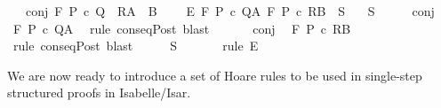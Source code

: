 \begin{isabellebody}
\ \ \ conj{\isacharcolon}\ {\isachardoublequoteopen}{\isasymGamma}{\isacharcomma}{\isasymTheta}{\isasymturnstile}\isactrlbsub {\isacharslash}F\isactrlesub \ P\ c\ {\isacharparenleft}Q\ {\isasyminter}\ R{\isacharparenright}{\isacharcomma}{\isacharparenleft}A\ {\isasyminter}\ B{\isacharparenright}{\isachardoublequoteclose}\ \isanewline
\ \ \ E{\isacharcolon}\ {\isachardoublequoteopen}{\isasymlbrakk}{\isasymGamma}{\isacharcomma}{\isasymTheta}{\isasymturnstile}\isactrlbsub {\isacharslash}F\isactrlesub \ P\ c\ Q{\isacharcomma}A{\isacharsemicolon}\ {\isasymGamma}{\isacharcomma}{\isasymTheta}{\isasymturnstile}\isactrlbsub {\isacharslash}F\isactrlesub \ P\ c\ R{\isacharcomma}B{\isasymrbrakk}\ {\isasymLongrightarrow}\ S{\isachardoublequoteclose}\isanewline
\ \ \ {\isachardoublequoteopen}S{\isachardoublequoteclose}\isanewline
%
\isadelimproof
%
\endisadelimproof
%
\isatagproof
{}\isamarkupfalse%
\ {\isacharminus}\isanewline
\ \ \isamarkupfalse%
\ conj\ \isamarkupfalse%
\ {\isachardoublequoteopen}{\isasymGamma}{\isacharcomma}{\isasymTheta}{\isasymturnstile}\isactrlbsub {\isacharslash}F\isactrlesub \ P\ c\ Q{\isacharcomma}A{\isachardoublequoteclose}\ \isamarkupfalse%
\ {\isacharparenleft}rule\ conseqPost{\isacharparenright}\ blast{\isacharplus}\isanewline
\ \ \isamarkupfalse%
\isanewline
\ \ \isamarkupfalse%
\ conj\ \isamarkupfalse%
\ {\isachardoublequoteopen}{\isasymGamma}{\isacharcomma}{\isasymTheta}{\isasymturnstile}\isactrlbsub {\isacharslash}F\isactrlesub \ P\ c\ R{\isacharcomma}B{\isachardoublequoteclose}\ \isamarkupfalse%
\ {\isacharparenleft}rule\ conseqPost{\isacharparenright}\ blast{\isacharplus}\isanewline
\ \ \isamarkupfalse%
\ \isamarkupfalse%
\ {\isachardoublequoteopen}S{\isachardoublequoteclose}\ \isanewline
\ \ \ \ \isamarkupfalse%
\ {\isacharparenleft}rule\ E{\isacharparenright}\isanewline
{}\isamarkupfalse%
%
\endisatagproof
{\isafoldproof}%
%
\isadelimproof
%
\endisadelimproof
%
\isamarkuptrue%
%
\begin{isamarkuptext}%
We are now ready to introduce a set of Hoare rules to be used in
 single-step structured proofs in Isabelle/Isar.  


\end{isamarkuptext}
\end{isabellebody}
